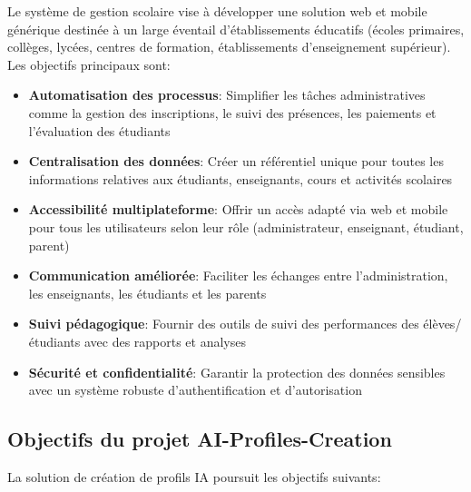 Le système de gestion scolaire vise à développer une solution web et mobile générique destinée à un large éventail d'établissements éducatifs (écoles primaires, collèges, lycées, centres de formation, établissements d'enseignement supérieur). Les objectifs principaux sont:

\begin{itemize}
  \item \textbf{Automatisation des processus}: Simplifier les tâches administratives comme la gestion des inscriptions, le suivi des présences, les paiements et l'évaluation des étudiants
  
  \item \textbf{Centralisation des données}: Créer un référentiel unique pour toutes les informations relatives aux étudiants, enseignants, cours et activités scolaires
  
  \item \textbf{Accessibilité multiplateforme}: Offrir un accès adapté via web et mobile pour tous les utilisateurs selon leur rôle (administrateur, enseignant, étudiant, parent)
  
  \item \textbf{Communication améliorée}: Faciliter les échanges entre l'administration, les enseignants, les étudiants et les parents
  
  \item \textbf{Suivi pédagogique}: Fournir des outils de suivi des performances des élèves/étudiants avec des rapports et analyses
  
  \item \textbf{Sécurité et confidentialité}: Garantir la protection des données sensibles avec un système robuste d'authentification et d'autorisation
\end{itemize}

\subsection{Objectifs du projet AI-Profiles-Creation}

La solution de création de profils IA poursuit les objectifs suivants:

